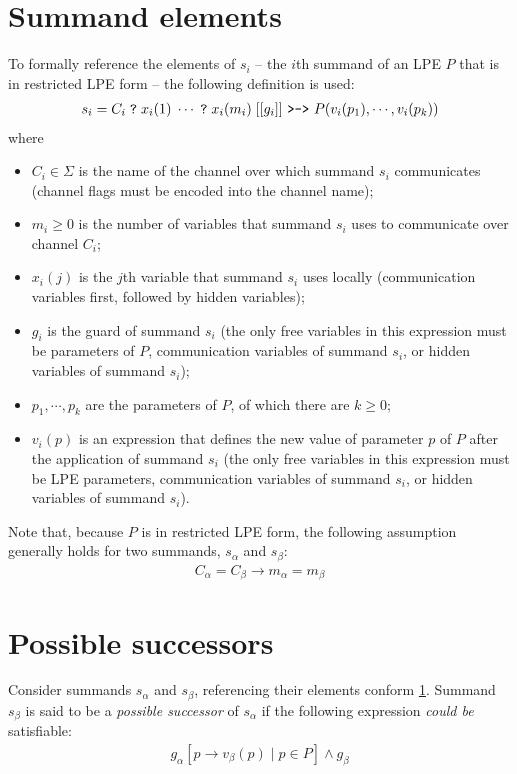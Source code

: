 \section{Summand elements} \label{summand-elements}

To formally reference the elements of $s_i$ -- the $i$th summand of an LPE $P$ that is in restricted LPE form -- the following definition is used:
\begin{align*}
s_i = C_i \; \texttt{?} \; x_i(1) \; \cdots{} \; \texttt{?} \; x_i(m_i) \; [[g_i]] \text{ \texttt{>->} } P(v_i(p_1), \cdots{}, v_i(p_k))
\end{align*}
where
\begin{itemize}
\item $C_i \in \Sigma$ is the name of the channel over which summand $s_i$ communicates (channel flags must be encoded into the channel name);
\item $m_i \geq 0$ is the number of variables that summand $s_i$ uses to communicate over channel $C_i$;
\item $x_i(j)$ is the $j$th variable that summand $s_i$ uses locally (communication variables first, followed by hidden variables);
\item $g_i$ is the guard of summand $s_i$ (the only free variables in this expression must be parameters of $P$, communication variables of summand $s_i$, or hidden variables of summand $s_i$);
\item $p_1, \cdots{}, p_k$ are the parameters of $P$, of which there are $k \geq 0$;
\item $v_i(p)$ is an expression that defines the new value of parameter $p$ of $P$ after the application of summand $s_i$ (the only free variables in this expression must be LPE parameters, communication variables of summand $s_i$, or hidden variables of summand $s_i$).
\end{itemize}

Note that, because $P$ is in restricted LPE form, the following assumption generally holds for two summands, $s_\alpha$ and $s_\beta$:
\begin{align*}
C_\alpha = C_\beta \rightarrow m_\alpha = m_\beta
\end{align*}

\section{Possible successors} \label{possible-successors}

Consider summands $s_\alpha$ and $s_\beta$, referencing their elements conform \ref{summand-elements}.
Summand $s_\beta$ is said to be a \emph{possible successor} of $s_\alpha$ if the following expression \emph{could be} satisfiable:
\begin{align*}
{g_\alpha}[p \rightarrow v_\beta(p) \;|\; p \in P] \land g_\beta
\end{align*}

